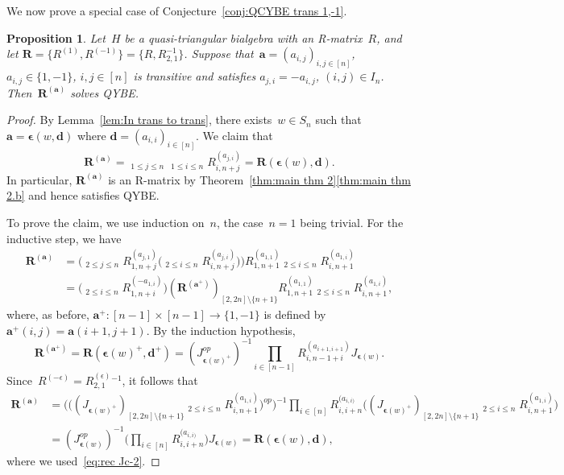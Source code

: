 \documentclass[12pt, reqno]{amsart}
\newtheorem{proposition}[theorem]{Proposition}
\theoremstyle{definition}
\newcommand{\ascprod}{\mathop{\overrightarrow{\prod}}}
\newcommand{\dscprod}{\mathop{\overleftarrow{\prod}}}
\numberwithin{equation}{section}
\newcommand{\sgna}[1]{\boldsymbol{\epsilon}(#1)}
\begin{document}
We now prove a special case of Conjecture~\ref{conj:QCYBE trans 1,-1}.
\begin{proposition}\label{prop:Spec trans conj}
Let~$H$ be a quasi-triangular bialgebra with an R-matrix~$R$,
and let $\mathbf R=\{R^{(1)},R^{(-1)}\}=\{R,R_{2,1}^{-1}\}$.
Suppose that~$\boldsymbol a=(a_{i,j})_{i,j\in[n]}$,
$a_{i,j}\in \{1,-1\}$, $i,j\in[n]$ is
transitive and satisfies $a_{j,i}=-a_{i,j}$, $(i,j)\in I_n$. Then~$\mathbf R^{(\boldsymbol a)}$ solves QYBE.
\end{proposition}
\begin{proof}
By Lemma~\ref{lem:In trans to trans}, 
there exists~$w\in S_n$ such that $\boldsymbol a=\boldsymbol\epsilon(w,\boldsymbol d)$ where
$\boldsymbol d=(a_{i,i})_{i\in [n]}$.
We claim that
$$
\mathbf R^{(\boldsymbol a)}=
\dscprod_{1\le j\le n} \ascprod_{1\le i\le n} 
R_{i,n+j}^{(a_{j,i})}=\mathbf R(\sgna{w},\boldsymbol d).
$$
In particular, $\mathbf R^{(\boldsymbol a)}$
is an R-matrix by Theorem~\ref{thm:main thm 2}\ref{thm:main thm 2.b} and
hence satisfies QYBE.

To prove the claim, we use induction on~$n$, the case~$n=1$ being trivial. For the inductive step, we have
\begin{align*}
\mathbf R^{(\boldsymbol{a})}&=
\Big(\dscprod_{2\le j\le n} R_{1,n+j}^{(a_{j,1})}\Big(\ascprod_{2\le i\le n} R_{i,n+j}^{(a_{j,i})}\Big)\Big)R_{1,n+1}^{(a_{1,1})}
\ascprod_{2\le i\le n} R_{i,n+1}^{(a_{1,i})}\\
&=\Big(\dscprod_{2\le i\le n} R_{1,n+i}^{(-a_{1,i})}
\Big) (\mathbf R^{(\boldsymbol{a}^+)})_{[2,2n]\setminus\{n+1\}}
R_{1,n+1}^{(a_{1,1})}
\ascprod_{2\le i\le n} R_{i,n+1}^{(a_{1,i})},
\end{align*}
where, as before, $\boldsymbol a^+:[n-1]\times[n-1]\to\{1,-1\}$ is defined by $\boldsymbol a^+(i,j)=\boldsymbol a(i+1,j+1)$. By the induction hypothesis,
$$\mathbf R^{(\boldsymbol a^+)}=\mathbf R(\sgna{w}^+,\boldsymbol d^+)=(J_{\sgna{w}^+}^{op})^{-1}
\prod_{i\in[n-1]} R_{i,n-1+i}^{(a_{i+1,i+1})} J_{\sgna{w}}.
$$
Since~$R^{(-\epsilon)}=R_{2,1}^{(\epsilon)}{}^{-1}$, it follows that
\begin{align*}
\mathbf R^{(\boldsymbol{a})}&=\Big(\Big((J_{\sgna{w}^+})_{[2,2n]\setminus\{n+1\}}\ascprod_{2\le i\le n} R_{i,n+1}^{(a_{1,i})}\Big)^{op}\Big)^{-1}
\prod_{i\in[n]} R_{i,i+n}^{(a_{i,i)}} \Big((J_{\sgna{w}^+})_{[2,2n]\setminus\{n+1\}}\ascprod_{2\le i\le n} R_{i,n+1}^{(a_{1,i})}\Big)\\
&=(J_{\sgna w}^{op})^{-1}\Big(\prod_{i\in[n]} R_{i,i+n}^{(a_{i,i)}}\Big) J_{\sgna w}=
\mathbf R(\sgna{w},\boldsymbol{d}),
\end{align*}
where we used~\eqref{eq:rec Jc-2}.
\end{proof}
\end{document}
